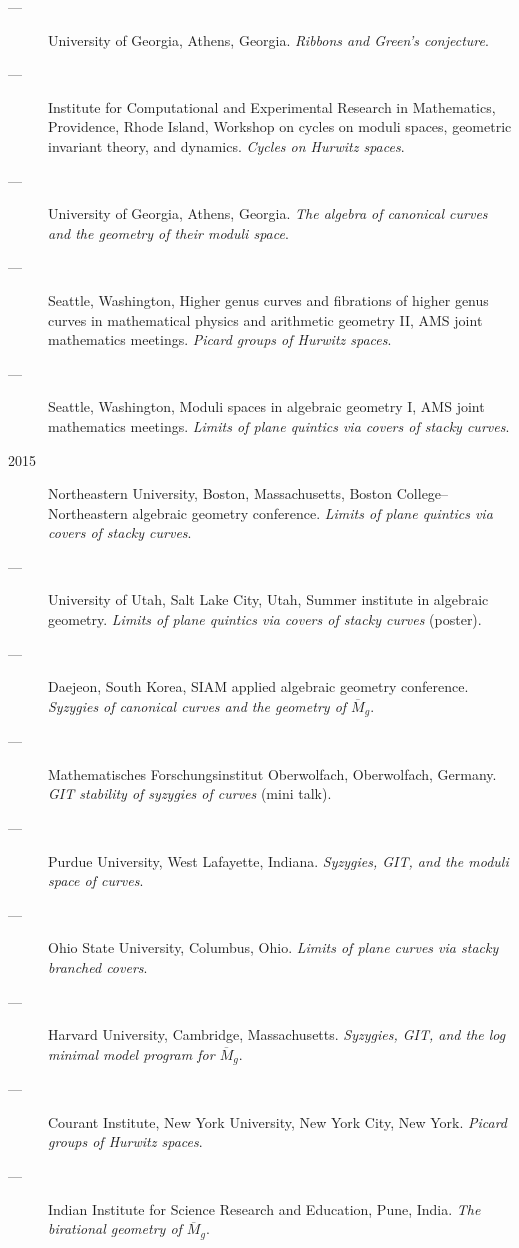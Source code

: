 \documentclass[11pt]{article}
\begin{document}
\begin{description}
\item[{---}] University of Georgia, Athens, Georgia. \emph{Ribbons and Green's conjecture}.
\item[{---}] Institute for Computational and Experimental Research in Mathematics, Providence, Rhode Island, Workshop on cycles on moduli spaces, geometric invariant theory, and dynamics. \emph{Cycles on Hurwitz spaces}.
\item[{---}] University of Georgia, Athens, Georgia. \emph{The algebra of canonical curves and the geometry of their moduli space}.
\item[{---}] Seattle, Washington, Higher genus curves and fibrations of higher genus curves in mathematical physics and arithmetic geometry II, AMS joint mathematics meetings. \emph{Picard groups of Hurwitz spaces}.
\item[{---}] Seattle, Washington, Moduli spaces in algebraic geometry I, AMS joint mathematics meetings. \emph{Limits of plane quintics via covers of stacky curves}.
\item[{2015}] Northeastern University, Boston, Massachusetts, Boston College--Northeastern algebraic geometry conference. \emph{Limits of plane quintics via covers of stacky curves}.
\item[{---}] University of Utah, Salt Lake City, Utah, Summer institute in algebraic geometry. \emph{Limits of plane quintics via covers of stacky curves} (poster).
\item[{---}] Daejeon, South Korea, SIAM applied algebraic geometry conference. \emph{Syzygies of canonical curves and the geometry of \(\overline M_g\)}.
\item[{---}] Mathematisches Forschungsinstitut Oberwolfach, Oberwolfach, Germany. \emph{GIT stability of syzygies of curves} (mini talk).
\item[{---}] Purdue University, West Lafayette, Indiana. \emph{Syzygies, GIT, and the moduli space of curves}.
\item[{---}] Ohio State University, Columbus, Ohio. \emph{Limits of plane curves via stacky branched covers}.
\item[{---}] Harvard University, Cambridge, Massachusetts. \emph{Syzygies, GIT, and the log minimal model program for \(\overline{M}_g\)}.
\item[{---}] Courant Institute, New York University, New York City, New York. \emph{Picard groups of Hurwitz spaces}.
\item[{---}] Indian Institute for Science Research and Education, Pune, India. \emph{The birational geometry of \(\overline M_g\)}.

\end{description}
\end{document}
